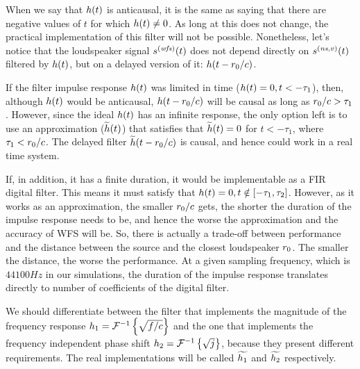When we say that $\freqFilter(t)$ is anticausal, it is the same as saying that there are negative values of $t$ for which $\freqFilter(t) \neq 0$. As long at this does not change, the practical implementation of this filter will not be possible. Nonetheless, let's notice that the loudspeaker signal $\signal[wfs][time](t)$ does not depend directly on $\signal[nsVirt][time](t)$ filtered by $\freqFilter(t)$, but on a delayed version of it: $\freqFilter(t - \distLinePrimSource/c)$.

If the filter impulse response $\freqFilter(t)$ was limited in time ($\freqFilter(t) = 0, t < -\tau_1$), then, although $\freqFilter(t)$ would be anticausal, $\freqFilter(t - \distLinePrimSource/c)$ will be causal as long as $r_0/c > \tau_1$. However, since the ideal $\freqFilter(t)$ has an infinite response, the only option left is to use an approximation ($\widetilde{\freqFilter}(t)$) that satisfies that $\widetilde{\freqFilter}(t) = 0$ for $t < -\tau_1$, where $\tau_1 < r_0/c$. The delayed filter $\widetilde{\freqFilter}(t - \distLinePrimSource/c)$ is causal, and hence could work in a real time system.

If, in addition, it has a finite duration, it would be implementable as a FIR digital filter. This means it must satisfy that $\freqFilter(t) = 0, t \notin [-\tau_1, \tau_2]$. However, as it works as an approximation, the smaller $r_0/c$ gets, the shorter the duration of the impulse response needs to be, and hence the worse the approximation and the accuracy of WFS will be. So, there is actually a trade-off between performance and the distance between the source and the closest loudspeaker $r_0$. The smaller the distance, the worse the performance. At a given sampling frequency, which is $44100 \si{Hz}$ in our simulations, the duration of the impulse response translates directly to number of coefficients of the digital filter.

We should differentiate between the filter that implements the magnitude of the frequency response $\freqFilter[time][magnitude] = \FourierTransform{\sqrt{f/c}}[inverse]$ and the one that implements the frequency independent phase shift $\freqFilter[time][phase] = \FourierTransform{\sqrt{j}}[inverse]$, because they present different requirements. The real implementations will be called $\widetilde{\freqFilter[time][magnitude]}$ and $\widetilde{\freqFilter[time][phase]}$ respectively.

